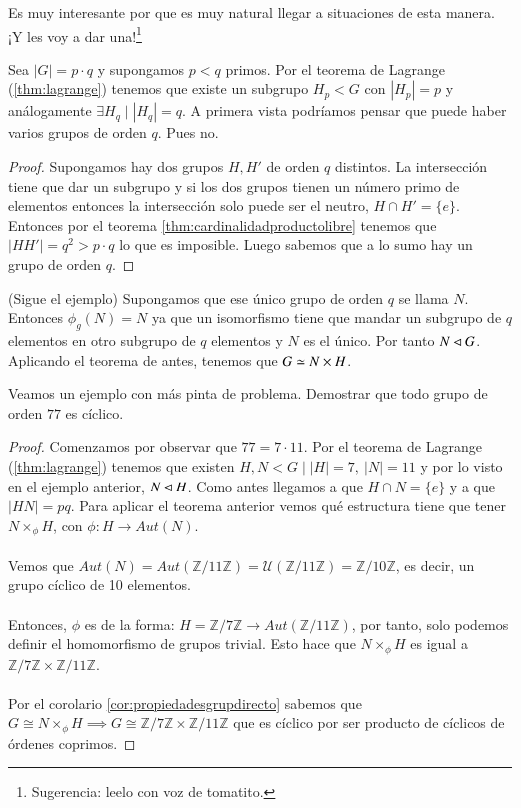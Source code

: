 Es muy interesante por que es muy natural llegar a situaciones de esta manera. ¡Y les voy a dar una!\footnote{Sugerencia: leelo con voz de tomatito.}

\begin{ej}
	Sea $|G| = p \cdot q$ y supongamos $p < q$ primos. Por el teorema de Lagrange (\ref{thm:lagrange}) tenemos que existe un subgrupo $H_p < G$ con $|H_p| = p$ y análogamente $\exists H_q \mid |H_q| = q$. A primera vista podríamos pensar que puede haber varios grupos de orden $q$. Pues no.
\end{ej}

\begin{proof}
	Supongamos hay dos grupos $H, H'$ de orden $q$ distintos. La intersección tiene que dar un subgrupo y si los dos grupos tienen un número primo de elementos entonces la intersección solo puede ser el neutro, $H \cap H' = \{e\}$. Entonces por el teorema \ref{thm:cardinalidadproductolibre} tenemos que $|HH'| = q^2 > p\cdot q$ lo que es imposible. Luego sabemos que a lo sumo hay un grupo de orden $q$.
\end{proof}

(Sigue el ejemplo) Supongamos que ese único grupo de orden $q$ se llama $N$. Entonces $\phi_g(N) = N$ ya que un isomorfismo tiene que mandar un subgrupo de $q$ elementos en otro subgrupo de $q$ elementos y $N$ es el único. Por tanto $N \lhd G$. Aplicando el teorema de antes, tenemos que $G \simeq N \times H$.

\begin{ej}
	Veamos un ejemplo con más pinta de problema. Demostrar que todo grupo de orden $77$ es cíclico.
\end{ej}

\begin{proof}
	Comenzamos por observar que $77 = 7 \cdot 11$. Por el teorema de Lagrange (\ref{thm:lagrange}) tenemos que existen $H, N < G \mid |H| = 7,\ |N| = 11$ y por lo visto en el ejemplo anterior, $N \lhd H$. Como antes llegamos a que $H \cap N = \{e\}$ y a que $|H N| = pq$. Para aplicar el teorema anterior vemos qué estructura tiene que tener $N \times_\phi H$, con $\phi:H\longrightarrow Aut(N)$.
	\\\\
	Vemos que $Aut(N) = Aut(\mathbb{Z}/11\mathbb{Z}) = \mathcal{U}(\mathbb{Z}/11\mathbb{Z}) = \mathbb{Z}/10\mathbb{Z}$, es decir, un grupo cíclico de 10 elementos.
	\\\\
	Entonces, $\phi$ es de la forma: $H = \mathbb{Z}/7\mathbb{Z} \longrightarrow Aut(\mathbb{Z}/11\mathbb{Z})$, por tanto, solo podemos definir el homomorfismo de grupos trivial. Esto hace que $N \times_\phi H$ es igual a $\mathbb{Z}/7\mathbb{Z} \times \mathbb{Z}/11\mathbb{Z}$.\\\\Por el corolario \ref{cor:propiedadesgrupdirecto} sabemos que $G \cong N \times_\phi H \implies G\cong \mathbb{Z}/7\mathbb{Z} \times \mathbb{Z}/11\mathbb{Z}$ que es cíclico por ser producto de cíclicos de órdenes coprimos.
\end{proof}

